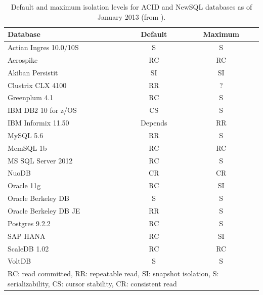 \begin{table}
\begin{center}
\begin{small}
\begin{tabular}{|l|c|c|}
\hline
Database & Default & Maximum\\\hline
Actian Ingres 10.0/10S & S & S\\
Aerospike & RC & RC\\
Akiban Persistit & SI & SI\\
Clustrix CLX 4100 & RR & ?\\
Greenplum 4.1 & RC & S \\
IBM DB2 10 for z/OS & CS & S\\
IBM Informix 11.50 & Depends & RR\\
MySQL 5.6 & RR & S \\
MemSQL 1b & RC & RC\\
MS SQL Server 2012 & RC & S \\
NuoDB & CR & CR\\
Oracle 11g & RC & SI\\
Oracle Berkeley DB & S & S\\
Oracle Berkeley DB JE & RR & S\\
Postgres 9.2.2 & RC & S\\
SAP HANA & RC & SI\\
ScaleDB 1.02 & RC & RC\\
VoltDB & S & S\\
\hline
\multicolumn{3}{|p{7cm}|}{{\footnotesize RC: read committed, RR: repeatable read, SI: snapshot isolation, S: serializability, CS: cursor stability, CR: consistent read}}\\\hline

\end{tabular}
\caption{Default and maximum isolation levels for ACID and NewSQL
  databases as of January 2013 (from
  \protect\cite{hat-hotos}).}\vspace{-1.5em}
\label{table:existing}
\end{small}
\end{center}
\end{table}

